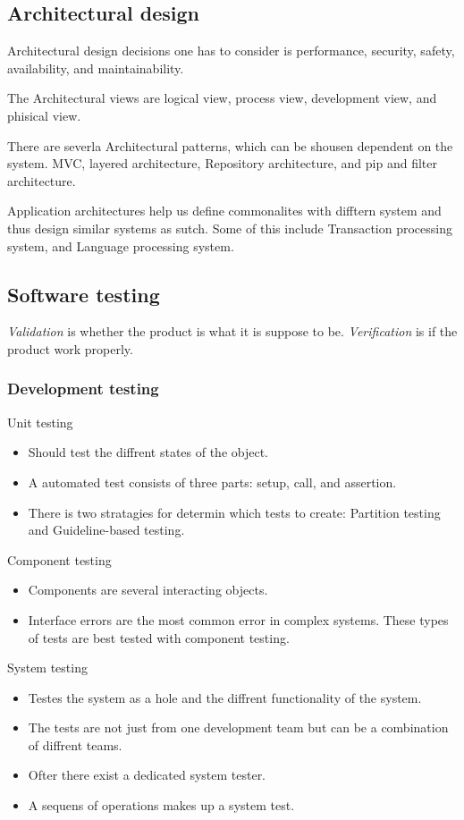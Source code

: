 \subsection{Architectural design}
Architectural design decisions one has to consider is performance, security, safety, availability, and maintainability. 

The Architectural views are logical view, process view, development view, and phisical view. %

There are severla Architectural patterns, which can be shousen dependent on the system.
MVC, layered architecture, Repository architecture, and pip and filter architecture.

Application architectures help us define commonalites with difftern system and thus design similar systems as sutch. Some of this include Transaction processing system, and Language processing system.

\subsection{Software testing}
\textit{Validation} is whether the product is what it is suppose to be.
\textit{Verification} is if the product work properly.


\subsubsection{Development testing}
Unit testing
\begin{itemize}
\item Should test the diffrent states of the object.
\item A automated test consists of three parts: setup, call, and assertion.
\item There is two stratagies for determin which tests to create: Partition testing and Guideline-based testing.
\end{itemize}

Component testing
\begin{itemize}
\item Components are several interacting objects.
\item Interface errors are the most common error in complex systems. These types of tests are best tested with component testing.
\end{itemize}

System testing
\begin{itemize}
\item Testes the system as a hole and the diffrent functionality of the system.
\item The tests are not just from one development team but can be a combination of diffrent teams.
\item Ofter there exist a dedicated system tester.
\item A sequens of operations makes up a system test.
\end{itemize}


